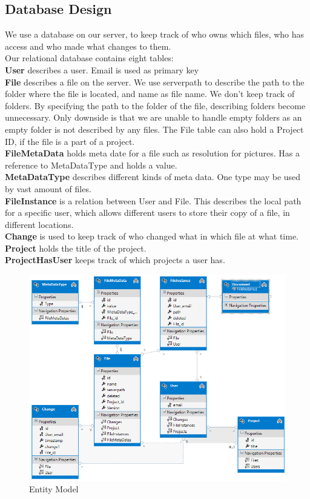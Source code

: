 \subsection{Database Design}
We use a database on our server, to keep track of who owns which files, who has access and who made what changes to them.\\
Our relational database contains eight tables:\\
\textbf{User} describes a user. Email is used as primary key\\
\textbf{File} describes a file on the server. We use serverpath to describe the path to the folder where the file is located, and name as file name. We don't keep track of folders. By specifying the path to the folder of the file, describing folders become unnecessary. Only downside is that we are unable to handle empty folders as an empty folder is not described by any files. The File table can also hold a Project ID, if the file is a part of a project.\\
\textbf{FileMetaData} holds meta date for a file such as resolution for pictures. Has a reference to MetaDataType and holds a value.\\
\textbf{MetaDataType} describes different kinds of meta data. One type may be used by vast amount of files.\\
\textbf{FileInstance} is a relation between User and File. This describes the local path for a specific user, which allows different users to store their copy of a file, in different locations.\\
\textbf{Change} is used to keep track of who changed what in which file at what time.\\
\textbf{Project} holds the title of the project.\\
\textbf{ProjectHasUser} keeps track of which projects a user has.\\
\begin{figure}[H]
  \includegraphics[width=\textwidth,natwidth=793,natheight=635]{illustrations/entitymodel.png}
  \caption{Entity Model}
  \label{entitymodel}
\end{figure}
